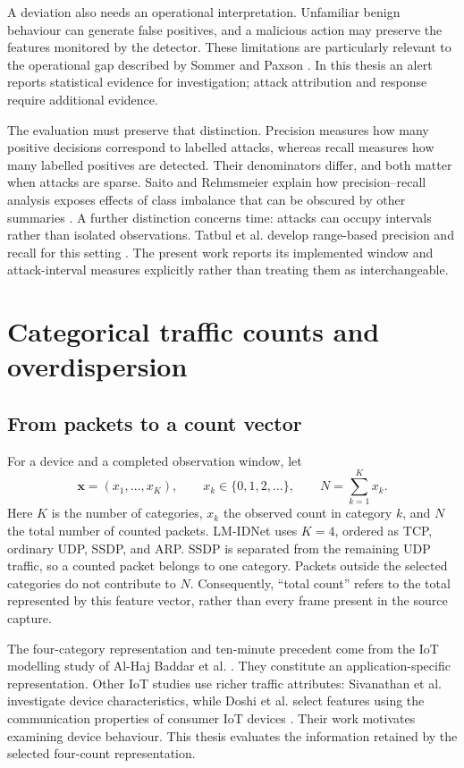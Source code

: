 A deviation also needs an operational interpretation. Unfamiliar
benign behaviour can generate false positives, and a malicious action may
preserve the features monitored by the detector. These limitations are
particularly relevant to the operational gap described by Sommer and
Paxson \cite{sommer2010}. In this thesis an alert reports statistical
evidence for investigation; attack attribution and response require
additional evidence.

The evaluation must preserve that distinction. Precision measures how many
positive decisions correspond to labelled attacks, whereas recall measures
how many labelled positives are detected. Their denominators differ, and
both matter when attacks are sparse. Saito and Rehmsmeier explain how
precision--recall analysis exposes effects of class imbalance that can be
obscured by other summaries \cite{saito2015}. A further distinction concerns
time: attacks can occupy intervals rather than isolated observations.
Tatbul et al. develop range-based precision and recall for this setting
\cite{tatbul2018}. The present work reports its implemented window and
attack-interval measures explicitly rather than treating them as
interchangeable.

\section{Categorical traffic counts and overdispersion}
\label{sec:background-counts}

\subsection{From packets to a count vector}

For a device and a completed observation window, let
\[
  \boldsymbol{x}=(x_1,\ldots,x_K),\qquad
  x_k\in\{0,1,2,\ldots\},\qquad
  N=\sum_{k=1}^{K}x_k.
\]
Here $K$ is the number of categories, $x_k$ the observed count in category
$k$, and $N$ the total number of counted packets. LM-IDNet uses $K=4$,
ordered as TCP, ordinary UDP, SSDP, and ARP. SSDP is separated from the
remaining UDP traffic, so a counted packet belongs to one category. Packets
outside the selected categories do not contribute to $N$. Consequently,
``total count'' refers to the total represented by this feature vector,
rather than every frame present in the source capture.

The four-category representation and ten-minute precedent come from the
IoT modelling study of Al-Haj Baddar et al. \cite{alhajbaddar2025iot}.
They constitute an application-specific representation. Other IoT studies use richer traffic
attributes: Sivanathan et al. investigate device characteristics, while
Doshi et al. select features using the communication properties of consumer
IoT devices \cite{sivanathan2019,doshi2018}. Their work motivates examining
device behaviour. This thesis evaluates the information retained by the
selected four-count representation.

